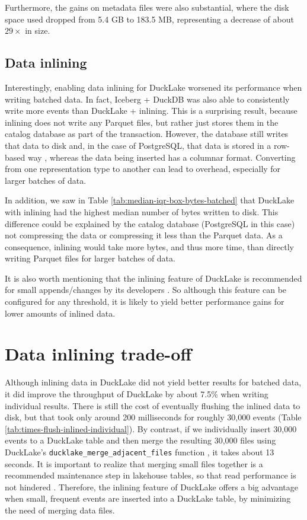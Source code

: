 Furthermore, the gains on metadata files were also substantial, where the disk space used dropped from 5.4 GB to 183.5 MB, representing a decrease of about $29\times$ in size.

\subsection{Data inlining}
Interestingly, enabling data inlining for DuckLake worsened its performance when writing batched data. In fact, Iceberg + DuckDB was also able to consistently write more events than DuckLake + inlining. This is a surprising result, because inlining does not write any Parquet files, but rather just stores them in the catalog database as part of the transaction. However, the database still writes that data to disk and, in the case of PostgreSQL, that data is stored in a row-based way \cite{user:simonPostgreSQLWikiColumnOrientedSTorage2014}, whereas the data being inserted has a columnar format. Converting from one representation type to another can lead to overhead, especially for larger batches of data.

In addition, we saw in Table \ref{tab:median-iqr-box-bytes-batched} that DuckLake with inlining had the highest median number of bytes written to disk. This difference could be explained by the catalog database (PostgreSQL in this case) not compressing the data or compressing it less than the Parquet data. As a consequence, inlining would take more bytes, and thus more time, than directly writing Parquet files for larger batches of data.

It is also worth mentioning that the inlining feature of DuckLake is recommended for small appends/changes by its developers \cite{DuckLakeDocumentationData2025}. So although this feature can be configured for any threshold, it is likely to yield better performance gains for lower amounts of inlined data.

\section{Data inlining trade-off}
Although inlining data in DuckLake did not yield better results for batched data, it did improve the throughput of DuckLake by about 7.5\% when writing individual results. There is still the cost of eventually flushing the inlined data to disk, but that took only around 200 milliseconds for roughly 30,000 events (Table \ref{tab:times-flush-inlined-individual}). By contrast, if we individually insert 30,000 events to a DuckLake table and then merge the resulting 30,000 files using DuckLake's \verb*|ducklake_merge_adjacent_files| function \cite{DucklakeDocumentationMerge2025}, it takes about 13 seconds. It is important to realize that merging small files together is a recommended maintenance step in lakehouse tables, so that read performance is not hindered \cite{DucklakeDocumentationMerge2025, apacheicebergMaintenance, matthewpowersDeltaLakeSmall2023}. Therefore, the inlining feature of DuckLake offers a big advantage when small, frequent events are inserted into a DuckLake table, by minimizing the need of merging data files.


